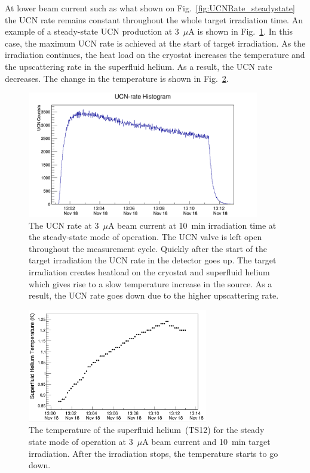 At lower beam current such as what shown on
Fig.~\ref{fig:UCNRate_steadystate} the UCN rate remains constant
throughout the whole target irradiation time. An example of a
steady-state UCN production at 3~$\mu$A is shown in
Fig.~\ref{fig:UCNRate_steadystate_highbeam}. In this case, the maximum UCN rate is
achieved at the start of target irradiation. As the irradiation
continues, the heat load on the cryostat increases the temperature and
the upscattering rate in the superfluid helium. As a result, the UCN
rate decreases. The change in the temperature is shown in
Fig.~\ref{fig:UCNRate_temp}.


\begin{figure}[h!]
  \centering
  \includegraphics[width=0.9\textwidth]{654_UCNRate.png}
  \caption{The UCN rate at 3~$\mu$A beam current at 10~min irradiation
    time at the steady-state mode of operation. The UCN valve is left
    open throughout the measurement cycle. Quickly after the start of
    the target irradiation the UCN rate in the detector goes up. The
    target irradiation creates heatload on the cryostat and superfluid
    helium which gives rise to a slow temperature increase in the
    source. As a result, the UCN rate goes down due to the higher
    upscattering rate.  }
  \label{fig:UCNRate_steadystate_highbeam}
\end{figure}

\begin{figure}[h!]
  \centering
  \includegraphics[width=0.7\textwidth]{UCNRate_temp.png}
  \caption{ The temperature of the superfluid helium~(TS12) for the
    steady state mode of operation at 3~$\mu$A beam current and 10~min
    target irradiation. After the irradiation stops, the temperature
    starts to go down. }
  \label{fig:UCNRate_temp}
\end{figure}

